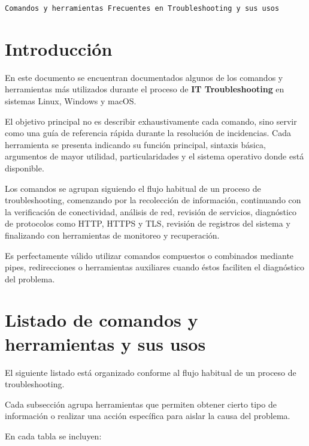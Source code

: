 \documentclass[a4paper,10pt]{article}
\begin{document}
\begin{center}
    {\Large \texttt{Comandos y herramientas Frecuentes en Troubleshooting y sus usos}}\\
\end{center}

\tableofcontents
\newpage

\section{Introducción}

En este documento se encuentran documentados algunos de los comandos y herramientas
más utilizados durante el proceso de \textbf{IT Troubleshooting} en sistemas
Linux, Windows y macOS.

El objetivo principal no es describir exhaustivamente cada comando, sino servir
como una guía de referencia rápida durante la resolución de incidencias.
Cada herramienta se presenta indicando su función principal, sintaxis básica,
argumentos de mayor utilidad, particularidades y el sistema operativo donde
está disponible.

Los comandos se agrupan siguiendo el flujo habitual de un proceso de
troubleshooting, comenzando por la recolección de información, continuando con
la verificación de conectividad, análisis de red, revisión de servicios,
diagnóstico de protocolos como HTTP, HTTPS y TLS, revisión de registros del
sistema y finalizando con herramientas de monitoreo y recuperación.

Es perfectamente válido utilizar comandos compuestos o combinados mediante
pipes, redirecciones o herramientas auxiliares cuando éstos faciliten el
diagnóstico del problema.

\vspace{0.5cm}



\section{Listado de comandos y herramientas y sus usos}

El siguiente listado está organizado conforme al flujo habitual de un proceso
de troubleshooting.

Cada subsección agrupa herramientas que permiten obtener cierto tipo de
información o realizar una acción específica para aislar la causa del problema.

En cada tabla se incluyen:
\end{document}
